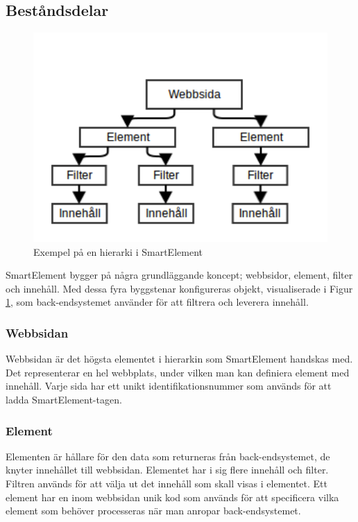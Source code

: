 \subsection{Beståndsdelar}

\begin{figure}[h!]
\centering
\includegraphics[width=120mm]{assets/images/smelementdatamodelabstract.png}
\caption{Exempel på en hierarki i SmartElement}
\label{abstractstructure}
\end{figure}

SmartElement bygger på några grundläggande koncept; webbsidor, element, filter och innehåll. Med dessa fyra byggstenar konfigureras objekt, visualiserade i Figur \ref{abstractstructure}, som back-endsystemet använder för att filtrera och leverera innehåll.

\subsubsection{Webbsidan}

Webbsidan är det högsta elementet i hierarkin som SmartElement handskas med. Det representerar en hel webbplats, under vilken man kan definiera element med innehåll. Varje sida har ett unikt identifikationsnummer som används för att ladda SmartElement-tagen.

\subsubsection{Element}

Elementen är hållare för den data som returneras från back-endsystemet, de knyter innehållet till webbsidan. Elementet har i sig flere innehåll och filter. Filtren används för att välja ut det innehåll som skall visas i elementet. Ett element har en inom webbsidan unik kod som används för att specificera vilka element som behöver processeras när man anropar back-endsystemet.

